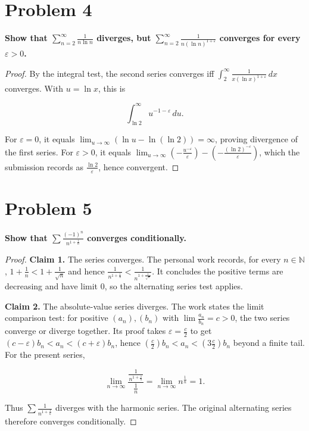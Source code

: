 \section{Problem 4}

\textbf{Show that \(\sum_{n = 2}^{\infty}\frac{1}{n\ln n}\) diverges, but \(\sum_{n = 2}^{\infty}\frac{1}{{n\left( {\ln n} \right)}^{1 + \varepsilon}}\) converges for every \(\varepsilon > 0\).}

\begin{proof}

By the integral test, the second series converges iff \(\int_{2}^{\infty}\frac{1}{{x\left( {\ln x} \right)}^{1 + \varepsilon}}\, dx\) converges. With \(u = \ln x\), this is

\[\int_{\ln 2}^{\infty}u^{- 1 - \varepsilon}\, du.\]

For \(\varepsilon = 0\), it equals \(\lim_{u\rightarrow\infty}\left( {\ln u - \ln\left( {\ln 2} \right)} \right) = \infty\), proving divergence of the first series. For \(\varepsilon > 0\), it equals \(\lim_{u\rightarrow\infty}\left( {- \frac{u^{- \varepsilon}}{\varepsilon}} \right) - \left( {- \frac{\left( {\ln 2} \right)^{- \varepsilon}}{\varepsilon}} \right)\), which the submission records as \(\frac{\ln 2}{\varepsilon}\), hence convergent.

\end{proof}

\section{Problem 5}

\textbf{Show that \(\sum\frac{\left( {- 1} \right)^{n}}{n^{1 + \frac{1}{n}}}\) converges conditionally.}

\begin{proof}

\textbf{Claim 1.} The series converges. The personal work records, for every \(n \in \mathbb{N}\), \(1 + \frac{1}{n} < 1 + \frac{1}{\sqrt{n}}\) and hence \(\frac{1}{n^{1 + \frac{1}{n}}} < \frac{1}{n^{1 + \frac{1}{\sqrt{n}}}}\). It concludes the positive terms are decreasing and have limit \(0\), so the alternating series test applies.

\textbf{Claim 2.} The absolute-value series diverges. The work states the limit comparison test: for positive \(\left( a_{n} \right),\left( b_{n} \right)\) with \(\lim\frac{a_{n}}{b_{n}} = c > 0\), the two series converge or diverge together. Its proof takes \(\varepsilon = \frac{c}{2}\) to get \(\left( {c - \varepsilon} \right)b_{n} < a_{n} < \left( {c + \varepsilon} \right)b_{n}\), hence \(\left( \frac{c}{2} \right)b_{n} < a_{n} < \left( {3\frac{c}{2}} \right)b_{n}\) beyond a finite tail. For the present series,

\[\lim\limits_{n\rightarrow\infty}\frac{\frac{1}{n^{1 + \frac{1}{n}}}}{\frac{1}{n}} = \lim\limits_{n\rightarrow\infty}n^{\frac{1}{n}} = 1.\]

Thus \(\sum\frac{1}{n^{1 + \frac{1}{n}}}\) diverges with the harmonic series. The original alternating series therefore converges conditionally.

\end{proof}

